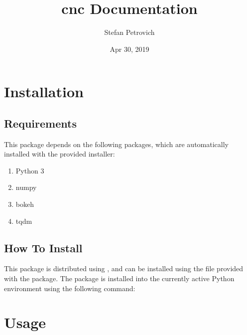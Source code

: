 \documentclass[letterpaper,10pt,english,openany,oneside]{sphinxmanual}
\title{cnc Documentation}
\date{Apr 30, 2019}
\author{Stefan Petrovich}
\begin{document}
\pagestyle{empty}
\maketitle
\pagestyle{plain}
\sphinxtableofcontents
\pagestyle{normal}
\label{\detokenize{index::doc}}



\chapter{Installation}
\label{\detokenize{installation:installation}}\label{\detokenize{installation::doc}}

\section{Requirements}
\label{\detokenize{installation:requirements}}
This package depends on the following packages, which are automatically
installed with the provided installer:
\begin{enumerate}
\def\theenumi{\arabic{enumi}}
\def\labelenumi{\theenumi .}
\makeatletter\def\p@enumii{\p@enumi \theenumi .}\makeatother
\item {} 
Python 3

\item {} 
numpy

\item {} 
bokeh

\item {} 
tqdm

\end{enumerate}


\section{How To Install}
\label{\detokenize{installation:how-to-install}}
This package is distributed using , and can be installed using the
 file provided with the package. The package is installed into the
currently active Python environment using the following command:

%
\begin{sphinxVerbatim}[commandchars=\\\{\}]
  
\end{sphinxVerbatim}


\chapter{Usage}
\label{\detokenize{usage:usage}}\label{\detokenize{usage::doc}}
\end{document}
